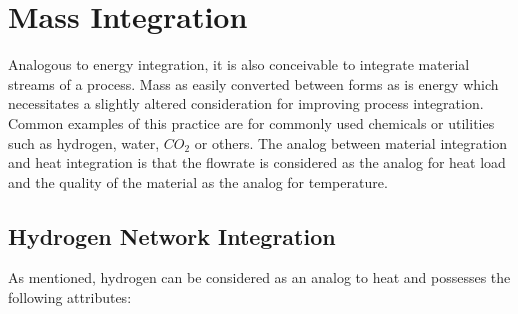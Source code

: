 \section{Mass Integration}

Analogous to energy integration, it is also conceivable to integrate material streams of a process. Mass as easily converted between forms as is energy which necessitates a slightly altered consideration for improving process integration. Common examples of this practice are for commonly used chemicals or utilities such as hydrogen, water, $CO_2$ or others. The analog between material integration and heat integration is that the flowrate is considered as the analog for heat load and the quality of the material as the analog for temperature. 

\subsection{Hydrogen Network Integration}
As mentioned, hydrogen can be considered as an analog to heat and possesses the following attributes:

